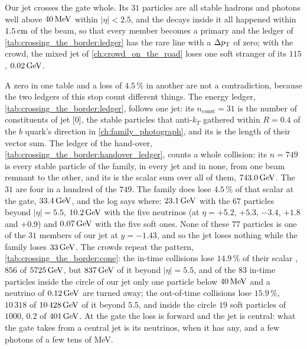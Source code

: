 Our jet crosses the gate whole. Its $31$ particles are all stable hadrons
and photons well above $40\,\mathrm{MeV}$ within $|\eta|<2.5$, and the decays inside
it all happened within $1.5\,\mathrm{cm}$ of the beam, so that every member becomes a
primary and the ledger of \cref{tab:crossing_the_border:ledger} has the
rare line with a $\Delta p_{\mathrm{T}}$ of zero; with the crowd, the mixed jet of
\cref{ch:crowd_on_the_road} loses one soft stranger of its $115$, $0.02\,\mathrm{GeV}$.

A zero in one table and a loss of $4.5\,\%$ in another are not a
contradiction, because the two ledgers of this stop count different
things. The energy ledger, \cref{tab:crossing_the_border:ledger}, follows
one jet: its $n_{\mathrm{const}}=31$ is the number of constituents of jet
[0], the stable particles that anti-$k_T$ gathered within $R=0.4$ of the
$b$ quark's direction in \cref{ch:family_photograph}, and its \pt is the
length of their vector sum. The ledger of the hand-over,
\cref{tab:crossing_the_border:handover_ledger}, counts a whole collision:
its $n=749$ is every stable particle of the family, in every jet and in
none, from one beam remnant to the other, and its \pt is the scalar sum
over all of them, $743.0\,\mathrm{GeV}$. The $31$ are four in a hundred of the $749$.
The family does lose $4.5\,\%$ of that scalar \pt at the gate, $33.4\,\mathrm{GeV}$,
and the log says where: $23.1\,\mathrm{GeV}$ with the $67$ particles beyond
$|\eta|=5.5$, $10.2\,\mathrm{GeV}$ with the five neutrinos (at $\eta=+5.2$, $+5.3$,
$-3.4$, $+1.8$ and $+0.9$) and $0.07\,\mathrm{GeV}$ with the five soft ones. None of
these $77$ particles is one of the $31$ members of our jet at $y=-1.43$,
and so the jet loses nothing while the family loses $33\,\mathrm{GeV}$. The crowds
repeat the pattern, \cref{tab:crossing_the_border:cone}: the in-time
collisions lose $14.9\,\%$ of their scalar \pt, $856$ of $5725\,\mathrm{GeV}$, but
$837\,\mathrm{GeV}$ of it beyond $|\eta|=5.5$, and of the $83$ in-time particles
inside the circle of our jet only one particle below $40\,\mathrm{MeV}$ and a neutrino of
$0.12\,\mathrm{GeV}$ are turned away; the out-of-time collisions lose $15.9\,\%$,
$10\,318$ of $10\,428\,\mathrm{GeV}$ of it beyond $5.5$, and inside the circle
$19$ soft particles of $1000$, $0.2$ of $401\,\mathrm{GeV}$. At the gate the loss is
forward and the jet is central: what the gate takes from a central jet is
its neutrinos, when it has any, and a few photons of a few tens of MeV.

